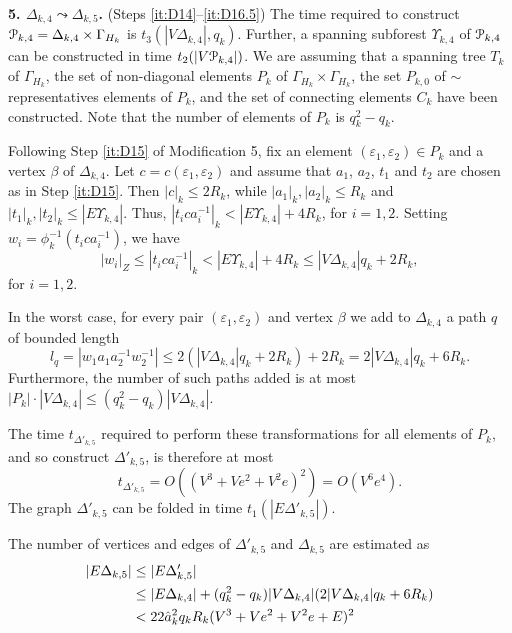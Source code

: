 \documentclass[a4paper,12pt]{article}
\renewcommand{\b}{\beta }
\newcommand{\G}{\Gamma }
\newcommand{\D}{\Delta }
\newcommand{\e}{\varepsilon }
\newcommand{\U}{\Upsilon }
\newcommand{\cP}{{\cal{P}}}
\numberwithin{equation}{section}
\numberwithin{figure}{section}
\begin{document}
{\bf 5. $\D_{k,4} \leadsto \D_{k,5}$.} (Steps \ref{it:D14}--\ref{it:D16.5}) The time required to construct
$\cP_{k,4}=\D_{k,4}\times \G_{H_k}$ is $t_3(|V \D_{k,4}|, q_k)$. Further,
 a spanning subforest $\U_{k,4}$ of $\cP_{k,4}$ can be constructed in time
$t_2(|V\cP_{k,4}|)$. We are assuming that  a spanning tree $T_k$ of
$\G_{H_k}$, the set of non-diagonal elements $P_k$ of
$\G_{H_k}\times \G_{H_k}$, the set $P_{k,0}$ of $\sim$ representatives
elements of $P_k$, and the set of connecting elements
 $C_k$ have been constructed. Note that the number of elements of $P_k$ is
$q_k^2-q_k$.



Following Step \ref{it:D15} of Modification 5, 
fix an element $(\e_1,\e_2)\in P_k$ and a vertex $\b$ of $\D_{k,4}$.
Let $c=c(\e_1,\e_2)$ and assume that $a_1$, $a_2$, $t_1$
and $t_2$  are chosen as in Step \ref{it:D15}. Then $|c|_k\le 2R_k$,
while $|a_1|_k, |a_2|_k\le R_k$ 
and $|t_1|_k,|t_2|_k \le |E\U_{k,4}|$. 
Thus, $|t_ica_i^{-1}|_k <  |E\U_{k,4}|+4R_k$, for
$i=1,2$. Setting $w_i=\phi^{-1}_k(t_ica_i^{-1})$, we have 
\[|w_i|_Z\le |t_ica_i^{-1}|_k <  |E\U_{k,4}|+4R_k\le |V\D_{k,4}|q_k+2R_k,\] for
$i=1,2$.

In the worst case, for every pair $(\e_1,\e_2) $ and vertex $\b$ we add
to $\D_{k,4}$ a path $q$ of bounded length \[l_q= |w_1 a_1a_2^{-1}
w_2^{-1}| \le 2( |V\D_{k,4}|q_k+2R_k  )+2 R_k
=2|V\D_{k,4}|q_k+6 R_k.\]
Furthermore, the number of such paths added is at most
$|P_k|\cdot|V\D_{k,4}|\le (q_k^2-q_k)|V\D_{k,4}|$. 

The time $t_{\D'_{k,5}}$ required to perform
these transformations for all elements of $P_k$, and
so construct $\D'_{k,5}$, is therefore at most
\begin{equation}\label{theta'5}
t_{\D'_{k,5}} = O((V^3+Ve^2+V^2e)^2)=O(V^6e^4).
\end{equation}
The graph $\D'_{k,5}$ can be folded in time $t_1(|E\D'_{k,5}|)$.

The number of vertices and edges of $\D'_{k,5}$ and $\D_{k,5}$ are estimated as
\begin{align}\label{etheta5}
|E\D_{k,5}| &\le |E\D'_{k,5}| \notag \\
&\le |E\D_{k,4}|+ 
(q_k^2-q_k)|V\D_{k,4}|(2|V\D_{k,4}|q_k+6 R_k)\notag \\
&<  22\hat a_k^2 q_kR_k(V^3+Ve^2+V^2e+E)^2
\end{align}
\end{document}
